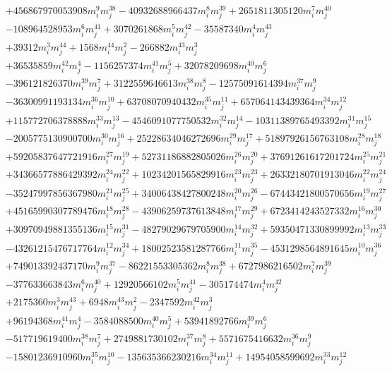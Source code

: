 {\begin{align*}
&+456867970053908m_i^{9}m_j^{38}-40932688966437m_i^{8}m_j^{39}+2651811305120m_i^{7}m_j^{40}\\
&-108964528953m_i^{6}m_j^{41}+3070261868m_i^{5}m_j^{42}-35587340m_i^{4}m_j^{43}\\
&+39312m_i^{3}m_j^{44}+1568m_i^{44}m_j^{2}-266882m_i^{43}m_j^{3}\\
&+36535859m_i^{42}m_j^{4}-1156257374m_i^{41}m_j^{5}+32078209698m_i^{40}m_j^{6}\\
&-396121826370m_i^{39}m_j^{7}+3122559646613m_i^{38}m_j^{8}-12575091614394m_i^{37}m_j^{9}\\
&-36300991193134m_i^{36}m_j^{10}+63708070940432m_i^{35}m_j^{11}+657064143439364m_i^{34}m_j^{12}\\
&+115772706378888m_i^{33}m_j^{13}-4546091077750532m_i^{32}m_j^{14}-10311389765493392m_i^{31}m_j^{15}\\
&-2005775130900700m_i^{30}m_j^{16}+25228634046272696m_i^{29}m_j^{17}+51897926156763108m_i^{28}m_j^{18}\\
&+59205837647721916m_i^{27}m_j^{19}+52731186882805026m_i^{26}m_j^{20}+37691261617201724m_i^{25}m_j^{21}\\
&+34366577886429392m_i^{24}m_j^{22}+10234201565829916m_i^{23}m_j^{23}+26332180701913046m_i^{22}m_j^{24}\\
&-35247997856367980m_i^{21}m_j^{25}+34006438427800248m_i^{20}m_j^{26}-67443421800570656m_i^{19}m_j^{27}\\
&+45165990307789476m_i^{18}m_j^{28}-43906259737613848m_i^{17}m_j^{29}+6723414243527332m_i^{16}m_j^{30}\\
&+30970949881355136m_i^{15}m_j^{31}-48279029679705900m_i^{14}m_j^{32}+59350471330899992m_i^{13}m_j^{33}\\
&-43261215476717764m_i^{12}m_j^{34}+18002523581287766m_i^{11}m_j^{35}-4531298564891645m_i^{10}m_j^{36}\\
&+749013392437170m_i^{9}m_j^{37}-86221553305362m_i^{8}m_j^{38}+6727986216502m_i^{7}m_j^{39}\\
&-377633663843m_i^{6}m_j^{40}+12920566102m_i^{5}m_j^{41}-305174474m_i^{4}m_j^{42}\\
&+2175360m_i^{3}m_j^{43}+6948m_i^{43}m_j^{2}-2347592m_i^{42}m_j^{3}\\
&+96194368m_i^{41}m_j^{4}-3584088500m_i^{40}m_j^{5}+53941892766m_i^{39}m_j^{6}\\
&-517719619400m_i^{38}m_j^{7}+2749881730102m_i^{37}m_j^{8}+5571675416632m_i^{36}m_j^{9}\\
&-15801236910960m_i^{35}m_j^{10}-135635366230216m_i^{34}m_j^{11}+14954058599692m_i^{33}m_j^{12}\\

\end{align*}}
